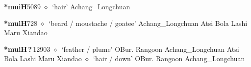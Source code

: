   \begin{list}{}{\leftmargin=1.5em \itemindent=-1.5em}
  \item {\footnotesize \textbf{*muiH}}{\tiny 5089}
         $\diamond$~`hair'
         Achang\_Longchuan 
  \item {\footnotesize \textbf{*muiH}}{\tiny 728}
\hspace{1ex}
         $\diamond$~`beard / moustache / goatee'
         Achang\_Longchuan 
\hspace{1ex}
         Atsi 
\hspace{1ex}
         Bola 
\hspace{1ex}
         Lashi 
\hspace{1ex}
         Maru 
\hspace{1ex}
         Xiandao 
  \item {\footnotesize \textbf{*muiH\,?\,}}{\tiny 12903}
\hspace{1ex}
         $\diamond$~`feather / plume'
         OBur. 
\hspace{1ex}
         Rangoon 
\hspace{1ex}
         Achang\_Longchuan 
\hspace{1ex}
         Atsi 
\hspace{1ex}
         Bola 
\hspace{1ex}
         Lashi 
\hspace{1ex}
         Maru 
\hspace{1ex}
         Xiandao 
\hspace{1ex}
         $\diamond$~`hair / down'
         OBur. 
\hspace{1ex}
         Rangoon 
\hspace{1ex}
         Achang\_Longchuan 
\hspace{1ex}

\end{list}
